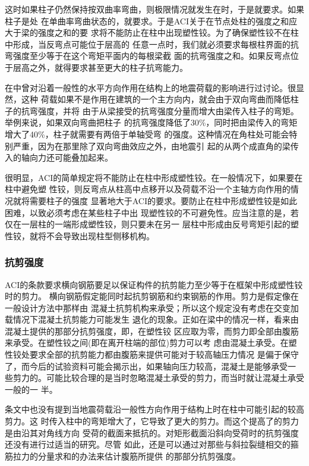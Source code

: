 \documentclass[12pt,a4paper]{book}
\begin{document}
这时如果柱子仍然保持按双曲率弯曲，则极限情况就发生在时，于是就要求。如果柱子是处
在单曲率弯曲状态的，就要求。于是ACI关于在节点处柱的强度之和应大于梁的强度之和的要
求将不能防止在柱中出现塑性铰。为了确保塑性铰不在柱中形成，当反弯点可能位于层高的
任意一点时，我们就必须要求每根柱界面的抗弯强度至少等于在这个弯矩平面内的每根梁截
面的抗弯强度之和。如果反弯点位于层高之外，就得要求甚至更大的柱子抗弯能力。

在中曾对沿着一般性的水平方向作用在结构上的地震荷载的影响进行过讨论。很显然，这种
荷载如果不是作用在建筑的一个主方向内，就会由于双向弯曲而降低柱子的抗弯强度，并将
由于从梁接受的抗弯强度分量而增大由梁传入柱子的弯矩。举例来说，如果双向弯曲把柱子
的抗弯强度降低了30\%，同时把由梁传入的弯矩增大了40\%，柱子就需要有两倍于单轴受弯
的强度。这种情况在角柱处可能会特别严重，因为在那里除了双向弯曲效应之外，由地震引
起的从两个成直角的梁传入的轴向力还可能叠加起来。

很明显，ACI的简单规定将不能防止在柱中形成塑性铰。在一般情况下，如果要在柱中避免塑
性铰，则反弯点从柱高中点移开以及荷载不沿一个主轴方向作用的情况就将需要柱子的强度
显著地大于ACI的要求。要防止在柱中形成塑性铰是如此困难，以致必须考虑在某些柱子中出
现塑性铰的不可避免性。应当注意的是，若仅在一层柱的一端形成塑性铰，则只要未在另一
层柱中形成由反号弯矩引起的塑性铰，就将不会导致出现柱型侧移机构。

\subsubsection{抗剪强度}

ACI的条款要求横向钢筋要足以保证构件的抗剪能力至少等于在框架中形成塑性铰时的剪力。
横向钢筋假定能同时起抗剪钢筋和约束钢筋的作用。剪力是假定像在一般设计方法中那样由
混凝土抗剪机构来承受；所以这个规定没有考虑在交变加载情况下混凝土抗剪能力可能发生
退化的现象。正如在梁中的情况一样，看来由混凝土提供的那部分抗剪强度，即，在塑性铰
区应取为零，而剪力即全部由腹筋来承受。在塑性铰之间(即在离开柱端的部位)剪力可以考
虑由混凝土承受。在塑性铰处要求全部的抗剪能力都由腹筋来提供可能对于较高轴压力情况
是偏于保守了，而今后的试验资料可能会揭示出，如果轴向压力较高，混凝土是能够承受一
些剪力的。可能比较合理的是当时忽略混凝土承受的剪力，而当时就让混凝土承受一般的一
半。

条文中也没有提到当地震荷载沿一般性方向作用于结构上时在柱中可能引起的较高剪力。这
时传入柱中的弯矩增大了，它导致了更大的剪力。而这个提高了的剪力是由沿其对角线方向
受荷的截面来抵抗的。对矩形截面沿斜向受荷时的抗剪强度还没有进行过适当的研究。尽管
如此，还是可以通过对那些与斜拉裂缝相交的箍筋拉力的分量求和的办法来估计腹筋所提供
的那部分抗剪强度。
\end{document}
